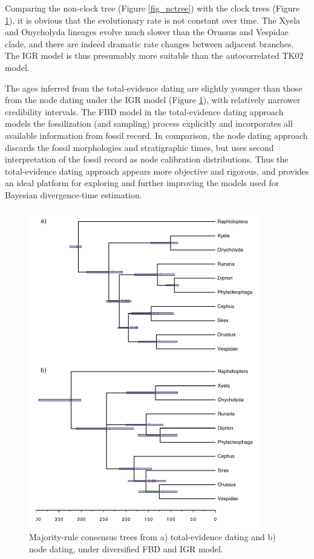 \documentclass[12pt]{article}
\begin{document}
Comparing the non-clock tree (Figure \ref{fig_nctree}) with the clock trees (Figure \ref{fig_cltree}), it is obvious that the evolutionary rate is not constant over time.
The Xyela and Onycholyda lineages evolve much slower than the Orussus and Vespidae clade, and there are indeed dramatic rate changes between adjacent branches.
The IGR model is thus presumably more suitable than the autocorrelated TK02 model.

The ages inferred from the total-evidence dating are slightly younger than those from the node dating under the IGR model (Figure \ref{fig_cltree}), with relatively narrower credibility intervals.
The FBD model in the total-evidence dating approach models the fossilization (and sampling) process explicitly and incorporates all available information from fossil record.
In comparison, the node dating approach discards the fossil morphologies and stratigraphic times, but uses second interpretation of the fossil record as node calibration distributions.
Thus the total-evidence dating approach appears more objective and rigorous, and provides an ideal platform for exploring and further improving the models used for Bayesian divergence-time estimation.

\begin{figure}[p]
\includegraphics[width=0.9\textwidth]{figures/cltree.pdf}
\caption{Majority-rule consensus trees from a) total-evidence dating and b) node dating, under diversified FBD and IGR model.}
\label{fig_cltree}
\end{figure}
\end{document}
